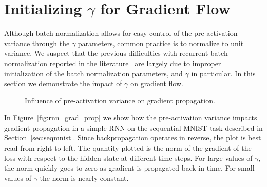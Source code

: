 \documentclass{article} %
\begin{document}
\section{Initializing $\gamma$ for Gradient Flow}
\label{sec:activation-variance}

Although batch normalization allows for easy control of the pre-activation variance through the $\gamma$ parameters,
common practice is to normalize to unit variance.
We suspect that the previous difficulties with recurrent batch normalization reported in the literature~\cite{cesar,baidu}
are largely due to improper initialization of the batch normalization parameters, and $\gamma$ in particular.
In this section we demonstrate the impact of $\gamma$ on gradient flow.


\begin{figure}[!ht]
  \center%
  \hspace{2mm}%
  \caption{
Influence of pre-activation variance on gradient propagation.
}
  \label{fig:variance}
\end{figure}

In Figure~\ref{fig:rnn_grad_prop} we show how the pre-activation variance impacts gradient propagation in a simple RNN on the sequential MNIST task described in Section~\ref{sec:seqmnist}.
Since backpropagation operates in reverse, the plot is best read from right to left.
The quantity plotted is the norm of the gradient of the loss with respect to the hidden state at different time steps.
For large values of $\gamma$, the norm quickly goes to zero as gradient is propagated back in time.
For small values of $\gamma$ the norm is nearly constant.
\end{document}
